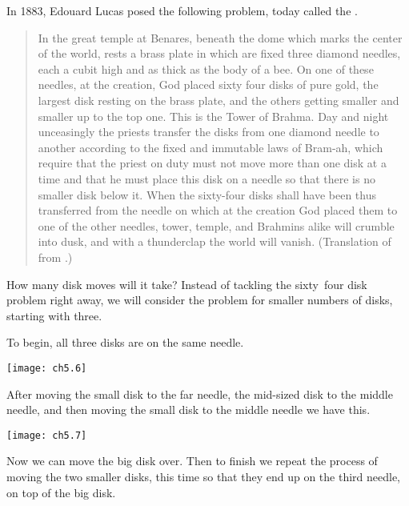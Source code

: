 In 1883, Edouard Lucas posed the following problem,
today called the .
\begin{quotation}
  \noindent
  In the great temple at Benares, beneath the dome which marks the center 
  of the world, rests a brass plate in which are fixed three diamond needles,
  each a cubit high and as thick as the body of a bee.
  On one of these needles, at the creation,
  God placed sixty four disks of pure gold, the largest disk resting on 
  the brass plate, and the others getting smaller and smaller up to the
  top one.
  This is the Tower of Brahma.
  Day and night unceasingly the priests transfer the disks from one diamond
  needle to another according to the fixed and immutable laws of Bram-ah,
  which require that the priest on duty must not move more than one disk at a 
  time and that he must place this disk on a needle so that there is no
  smaller disk below it.
  When the sixty-four disks shall have been thus transferred from the needle
  on which at the creation God placed them to one of the other needles,
  tower, temple, and Brahmins alike will crumble into dusk, and with
  a thunderclap the world will vanish.
  (Translation of \cite{DeParville} from \cite{Ball}.)
\end{quotation}
How many disk moves will it take?
Instead of tackling the sixty~four disk problem right away, 
we will consider the 
problem for smaller numbers of disks, starting with three.

To begin, all three disks are on the same needle.
\begin{center}
  \texttt{[image: ch5.6]}
\end{center}
After moving the small disk to the far needle, the mid-sized disk to the
middle needle, and then moving the small disk to the middle needle
we have this. 
\begin{center}
  \texttt{[image: ch5.7]}
\end{center}
Now we can  move the big disk over.
Then to finish we repeat the process of moving the two smaller 
disks, this time so that they end up on the third needle, 
on top of the big disk.


